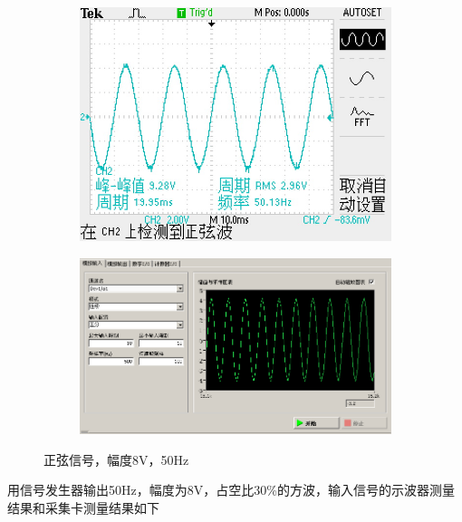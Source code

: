 \documentclass{ctexart}
\begin{document}
\begin{figure}[H]
  \centering
  \begin{subfigure}{0.41\linewidth}
    \includegraphics[width=\linewidth]{LabVIEW使用基础/信号测量系统测试/模拟输入/正弦波/示波器.JPG}
  \end{subfigure}
  \begin{subfigure}{0.54\linewidth}
    \includegraphics[width=\linewidth]{LabVIEW使用基础/信号测量系统测试/模拟输入/正弦波/虚拟仪器.PNG}
  \end{subfigure}
  \caption{正弦信号，幅度8V，50Hz}
\end{figure}

用信号发生器输出50Hz，幅度为8V，占空比30\%的方波，输入信号的示波器测量结果和采集卡测量结果如下
\end{document}
